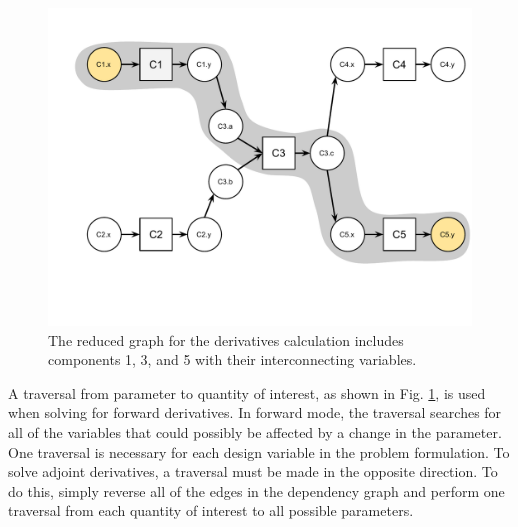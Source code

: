 \documentclass[]{aiaa-tc} %
\begin{document}
        \begin{figure}[!htb]\begin{center}
          \includegraphics[width=.8\textwidth]{images/relevant-path-graph}
          \caption{ The reduced graph for the derivatives calculation includes components 1, 3,
          and 5 with their interconnecting variables. \label{fig:graph2}}
        \end{center}\end{figure}

        A traversal from parameter to quantity of interest, as shown in Fig. \ref{fig:graph2}, is used when solving for
        forward derivatives. In forward mode, the traversal searches for all of the variables that could possibly
        be affected by a change in the parameter. One traversal is necessary for each design variable in the
        problem formulation. To solve adjoint derivatives, a traversal must be made in
        the opposite direction. To do this, simply reverse all of the edges in the dependency graph and
        perform one traversal from each quantity of interest to all possible parameters.
\end{document}
